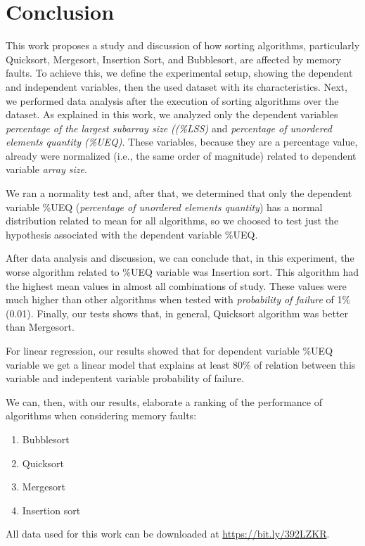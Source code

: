 \section{Conclusion}

This work proposes a study and discussion of how sorting algorithms, particularly Quicksort, Mergesort, Insertion Sort, and Bubblesort, are affected by memory faults. To achieve this, we define the experimental setup, showing the dependent and independent variables, then the used dataset with its characteristics. Next, we performed data analysis after the execution of sorting algorithms over the dataset. As explained in this work, we analyzed only the dependent variables \textit{percentage of the largest subarray size ((\%LSS)} and \textit{percentage of unordered elements quantity (\%UEQ)}. These variables, because they are a percentage value, already were normalized (i.e., the same order of magnitude) related to dependent variable \textit{array size}.

We ran a normality test and, after that, we determined that only the dependent variable \%UEQ (\textit{percentage of unordered elements quantity}) has a normal distribution related to mean for all algorithms, so we choosed to test just the hypothesis associated with the dependent variable \%UEQ.

After data analysis and discussion, we can conclude that, in this experiment, the worse algorithm related to \%UEQ variable was Insertion sort. This algorithm had the highest mean values in almost all combinations of study. These values were much higher than other algorithms when tested with \textit{probability of failure} of 1\% (0.01). Finally, our tests shows that, in general, Quicksort algorithm was better than Mergesort.

For linear regression, our results showed that for dependent variable \%UEQ variable we get a linear model that explains at least 80\% of relation between this variable and indepentent variable probability of failure.

We can, then, with our results, elaborate a ranking of the performance of algorithms when considering memory faults:
\begin{enumerate}
    \item Bubblesort
    \item Quicksort
    \item Mergesort
    \item Insertion sort
\end{enumerate}

All data used for this work can be downloaded at \href{https://bit.ly/392LZKR}{https://bit.ly/392LZKR}.